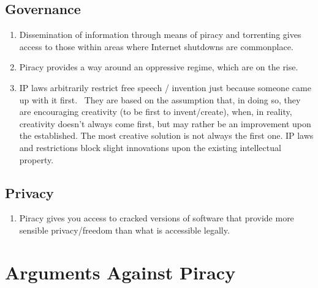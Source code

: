\documentclass[onecolumn, 12pt]{article}
\begin{document}
\subsection{Governance}

\begin{enumerate}
  \item Dissemination of information through means of piracy and torrenting
    gives access to those within areas where Internet shutdowns are commonplace.

  \item Piracy provides a way around an oppressive regime, which are on the
    rise.~\cite{current:jigsaw}

  \item IP laws arbitrarily restrict free speech / invention just because
    someone came up with it first.~\cite[1339]{lemley:faith-based} They are
    based on the assumption that, in doing so, they are encouraging creativity
    (to be first to invent/create), when, in reality, creativity doesn't always
    come first, but may rather be an improvement upon the established. The most
    creative solution is not always the first one. IP laws and restrictions
    block slight innovations upon the existing intellectual property.
\end{enumerate}

\subsection{Privacy}

\begin{enumerate}
  \item Piracy gives you access to cracked versions of software that provide
    more sensible privacy/freedom than what is accessible
    legally.~\cite{stallman:right-to-read}
\end{enumerate}

\section{Arguments Against Piracy}
\end{document}
